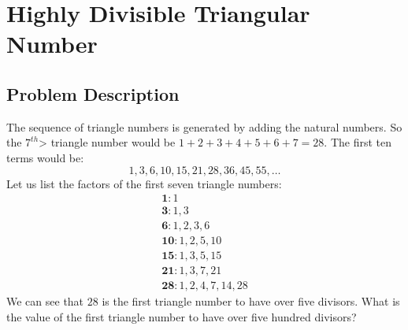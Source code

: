 \section{Highly Divisible Triangular Number}
\subsection{Problem Description}
The sequence of triangle numbers is generated by adding the natural numbers. So the $7^{th}$> triangle number would be $1 + 2 + 3 + 4 + 5 + 6 + 7 = 28$. The first ten terms would be:
$$1, 3, 6, 10, 15, 21, 28, 36, 45, 55, \dots$$
Let us list the factors of the first seven triangle numbers:
\begin{align*}
\mathbf 1 \colon 1\\
\mathbf 3 \colon 1,3\\
\mathbf 6 \colon 1,2,3,6\\
\mathbf{10} \colon 1,2,5,10\\
\mathbf{15} \colon 1,3,5,15\\
\mathbf{21} \colon 1,3,7,21\\
\mathbf{28} \colon 1,2,4,7,14,28
\end{align*}
We can see that $28$ is the first triangle number to have over five divisors.
What is the value of the first triangle number to have over five hundred divisors?
